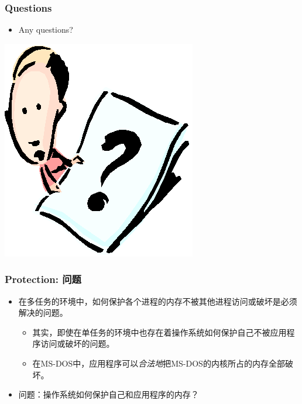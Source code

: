 \documentclass[CJKutf8,xcolor=pdftex,dvipsnames,table]{beamer}
\begin{document}
\begin{CJK*}{UTF8}{song}
  \begin{frame}
  \frametitle{Questions}
  \begin{itemize}
  \item{Any questions?}
  \end{itemize}
  \begin{center}
    \includegraphics[scale=.5]{question}
  \end{center}
  \end{frame}

  \begin{frame}
  \frametitle{Protection: 问题} \pause
  \begin{itemize}
  \item{在多任务的环境中，如何保护各个进程的内存不被其他进程访问或破坏是必须解决的问题。} \pause
    \begin{itemize}
    \item{其实，即使在单任务的环境中也存在着操作系统如何保护自己不被应用程序访问或破坏的问题。} \pause
    \item{在MS-DOS中，应用程序可以\emph{合法地}把MS-DOS的内核所占的内存全部破坏。} \pause
    \end{itemize}
  \item{问题：操作系统如何保护自己和应用程序的内存？}
  \end{itemize}
  \end{frame}
  

\end{CJK*}
\end{document}
